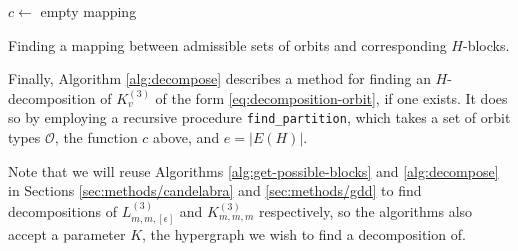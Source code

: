 \begin{algorithm}

$c \gets$ empty mapping\;
\;

\caption{Finding a mapping between admissible sets of orbits and corresponding $H$-blocks.} \label{alg:get-possible-blocks}
\end{algorithm}

Finally, Algorithm \ref{alg:decompose} describes a method for finding an $H$-decomposition of $K_{v}^{(3)}$ of the form \eqref{eq:decomposition-orbit}, if one exists. It does so by employing a recursive procedure {\tt find\_partition}, which takes a set of orbit types $\mathcal{O}$, the function $c$ above, and $e = |E(H)|$.

Note that we will reuse Algorithms \ref{alg:get-possible-blocks} and \ref{alg:decompose} in Sections \ref{sec:methods/candelabra} and \ref{sec:methods/gdd} to find decompositions of $L_{m,m,[\epsilon]}^{(3)}$ and $K_{m,m,m}^{(3)}$ respectively, so the algorithms also accept a parameter $K$, the hypergraph we wish to find a decomposition of.

